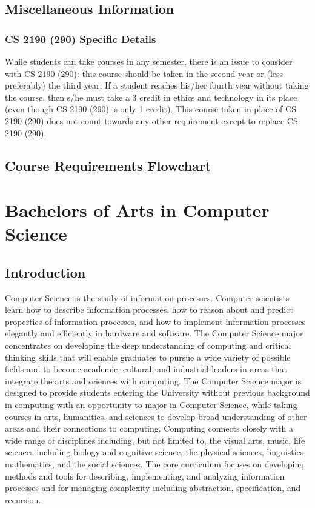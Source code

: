 \documentclass[10pt,letter]{book}
\newcommand{\mychapter}[2]{\chapter{#1}\renewcommand{\leftmark}{\textsc{#2}}}
\newcommand{\mysection}[1]{\section{#1}\renewcommand{\rightmark}{#1}}
\begin{document}
\mysection{Miscellaneous Information}
\subsection{CS 2190 (290) Specific Details}

While students can take courses in any semester, there is an issue to
consider with CS 2190 (290): this course should be taken in the second
year or (less preferably) the third year. If a student reaches
his/her fourth year without taking the course, then s/he must take a 3
credit in ethics and technology in its place (even though CS 2190
(290) is only 1 credit). This course taken in place of CS 2190 (290)
does not count towards any other requirement except to replace CS 2190
(290).



\clearpage
\mysection{Course Requirements Flowchart}

\begin{figure}[h!]
\end{figure}


\clearpage
\mychapter{Bachelors of Arts in Computer Science}{BA CS Degree}

\mysection{Introduction}

Computer Science is the study of information processes. Computer
scientists learn how to describe information processes, how to reason
about and predict properties of information processes, and how to
implement information processes elegantly and efficiently in hardware
and software. The Computer Science major concentrates on developing
the deep understanding of computing and critical thinking skills that
will enable graduates to pursue a wide variety of possible fields and
to become academic, cultural, and industrial leaders in areas that
integrate the arts and sciences with computing. The Computer Science
major is designed to provide students entering the University without
previous background in computing with an opportunity to major in
Computer Science, while taking courses in arts, humanities, and
sciences to develop broad understanding of other areas and their
connections to computing. Computing connects closely with a wide range
of disciplines including, but not limited to, the visual arts, music,
life sciences including biology and cognitive science, the physical
sciences, linguistics, mathematics, and the social sciences. The core
curriculum focuses on developing methods and tools for describing,
implementing, and analyzing information processes and for managing
complexity including abstraction, specification, and recursion. 
\end{document}

